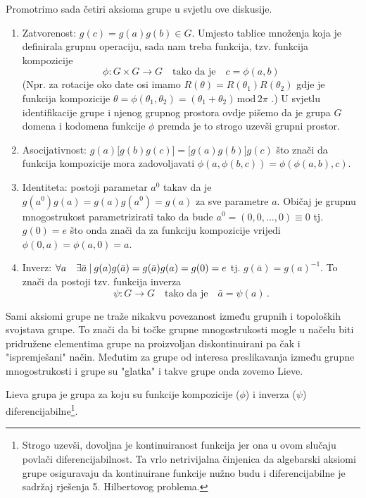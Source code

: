 Promotrimo sada četiri aksioma grupe u svjetlu ove diskusije.
\begin{enumerate}
\item Zatvorenost: $g(c)=g(a)g(b) \in G$. Umjesto tablice množenja koja
    je definirala grupnu operaciju, sada nam treba funkcija, tzv.
    funkcija kompozicije
    \[\phi: G\times G \to G \quad  \text{tako da je} \quad c=\phi(a,b) \]
    (Npr. za rotacije oko date osi imamo $R(\theta) = R(\theta_1) R(\theta_2)$
    gdje je funkcija kompozicije  $\theta = \phi(\theta_1, \theta_2) =
    (\theta_1 + \theta_2)\, \mathrm{mod}\, 2\pi$ .) U svjetlu identifikacije
    grupe i njenog grupnog prostora ovdje pišemo da je grupa $G$ domena i kodomena funkcije $\phi$
    premda je to strogo uzevši grupni prostor.

\item Asocijativnost: $g(a)\big[g(b)g(c)\big]=\big[g(a)g(b)\big]g(c)$ što
    znači da funkcija kompozicije mora zadovoljavati
    $\phi(a, \phi(b,c))=\phi(\phi(a,b),c) $.

\item Identiteta: postoji parametar $a^0$ takav da je 
       $g(a^0)g(a)=g(a)g(a^0)=g(a)$ za sve parametre $a$.
    Običaj je grupnu mnogostrukost parametrizirati tako da bude $a^0=(0, 0, \ldots, 0)
     \equiv 0$ tj. $g(0)=e$ što onda znači da za funkciju
     kompozicije vrijedi $\phi(0,a)=\phi(a,0)=a$.

\item Inverz: $\forall a\quad \exists \bar{a} \: | \: g(a)g(\bar{a})=
        g(\bar{a})g(a)=g(0)=e$ tj. $g(\bar{a})=g(a)^{-1}$. To znači
        da postoji tzv. funkcija inverza
        \[ \psi:G\to G   \quad  \text{tako da je} \quad \bar{a}=\psi(a) \,. \]

\end{enumerate}

Sami aksiomi grupe ne traže nikakvu povezanost između grupnih i topoloških
svojstava grupe. To znači da bi točke grupne mnogostrukosti mogle u načelu biti
pridružene elementima grupe na proizvoljan diskontinuirani pa čak i "ispremješani"
način. Međutim za grupe od interesa preslikavanja između grupne mnogostrukosti
i grupe su "glatka" i takve grupe onda zovemo Lieve.

\begin{definicija}
  Lieva grupa je grupa za koju su funkcije kompozicije
($\phi$) i inverza ($\psi$) diferencijabilne\footnote{Strogo uzevši, 
    dovoljna je kontinuiranost funkcija jer ona u ovom slučaju povlači diferencijabilnost.
 Ta vrlo netrivijalna činjenica da algebarski aksiomi
 grupe osiguravaju da kontinuirane funkcije nužno budu i diferencijabilne
 je sadržaj rješenja 5. Hilbertovog problema.}.
\end{definicija}

